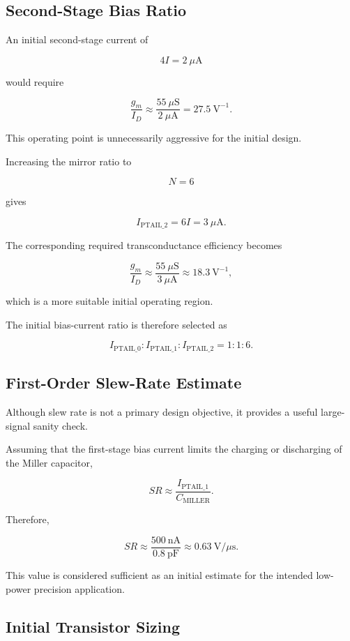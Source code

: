 \subsection{Second-Stage Bias Ratio}

An initial second-stage current of

\[
4I = 2~\mu\mathrm{A}
\]

would require

\[
\frac{g_m}{I_D}
\approx
\frac{55~\mu\mathrm{S}}
     {2~\mu\mathrm{A}}
=
27.5~\mathrm{V}^{-1}.
\]

This operating point is unnecessarily aggressive for the initial design.

Increasing the mirror ratio to

\[
N = 6
\]

gives

\[
I_{\mathrm{PTAIL\_2}}
=
6I
=
3~\mu\mathrm{A}.
\]

The corresponding required transconductance efficiency becomes

\[
\frac{g_m}{I_D}
\approx
\frac{55~\mu\mathrm{S}}
     {3~\mu\mathrm{A}}
\approx
18.3~\mathrm{V}^{-1},
\]

which is a more suitable initial operating region.

The initial bias-current ratio is therefore selected as

\[
\boxed{
I_{\mathrm{PTAIL\_0}}
:
I_{\mathrm{PTAIL\_1}}
:
I_{\mathrm{PTAIL\_2}}
=
1:1:6
}.
\]


\subsection{First-Order Slew-Rate Estimate}

Although slew rate is not a primary design objective, it provides a useful
large-signal sanity check.

Assuming that the first-stage bias current limits the charging or
discharging of the Miller capacitor,

\[
SR
\approx
\frac{I_{\mathrm{PTAIL\_1}}}
     {C_{\mathrm{MILLER}}}.
\]

Therefore,

\[
SR
\approx
\frac{500~\mathrm{nA}}
     {0.8~\mathrm{pF}}
\approx
0.63~\mathrm{V}/\mu\mathrm{s}.
\]

This value is considered sufficient as an initial estimate for the intended
low-power precision application.

\subsection{Initial Transistor Sizing}


